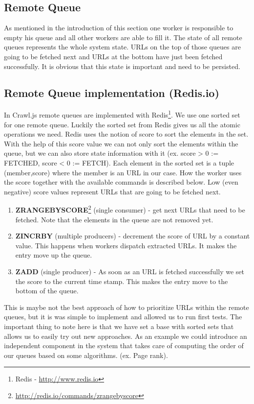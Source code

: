 \subsection{Remote Queue}
\label{queues_remote}
As mentioned in the introduction of this section one worker is responsible to empty his queue and all other workers are able to fill it. The state of all remote queues represents the whole system state. URLs on the top of those queues are going to be fetched next and URLs at the bottom have just been fetched successfully. It is obvious that this state is important and need to be persisted. 


\subsection{Remote Queue implementation (Redis.io)}
In Crawl.js remote queues are implemented with Redis\footnote{Redis - \url{http://www.redis.io}}. We use one sorted set for one remote queue. Luckily the sorted set from Redis gives us all the atomic operations we need. Redis uses the notion of score to sort the elements in the set. With the help of this score value we can not only sort the elements within the queue, but we can also store state information with it (ex. score > 0 := FETCHED, score < 0 := FETCH). Each element in the sorted set is a tuple (member,score) where the member is an URL in our case. How the worker uses the score together with the available commands is described below. Low (even negative) score values represent URLs that are going to be fetched next.

\begin{enumerate}
  \item \textbf{ZRANGEBYSCORE}\footnote{\url{http://redis.io/commands/zrangebyscore}} (single consumer) - get next URLs that need to be fetched. Note that the elements in the queue are not removed yet.
  \item \textbf{ZINCRBY} (multiple producers) - decrement the score of URL by a constant value. This happens when workers dispatch extracted URLs. It makes the entry move up the queue.
  \item \textbf{ZADD} (single producer) - As soon as an URL is fetched successfully we set the score to the current time stamp. This makes the entry move to the bottom of the queue.
\end{enumerate}

This is maybe not the best approach of how to prioritize URLs within the remote queues, but it is was simple to implement and allowed us to run first tests. The important thing to note here is that we have set a base with sorted sets that allows us to easily try out new approaches. As an example we could introduce an independent component in the system that takes care of computing the order of our queues based on some algorithms. (ex. Page rank).


